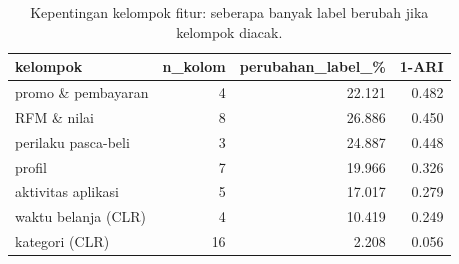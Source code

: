 \begin{table}[ht]
\centering\small
\begin{tabular}{lrrr}
\toprule
kelompok & n\_kolom & perubahan\_label\_\% & 1-ARI \\
\midrule
promo \& pembayaran & 4 & 22.121 & 0.482 \\
RFM \& nilai & 8 & 26.886 & 0.450 \\
perilaku pasca-beli & 3 & 24.887 & 0.448 \\
profil & 7 & 19.966 & 0.326 \\
aktivitas aplikasi & 5 & 17.017 & 0.279 \\
waktu belanja (CLR) & 4 & 10.419 & 0.249 \\
kategori (CLR) & 16 & 2.208 & 0.056 \\
\bottomrule
\end{tabular}
\caption{Kepentingan kelompok fitur: seberapa banyak label berubah jika kelompok diacak.}
\label{tab:t3_kepentingan_kelompok}
\end{table}
